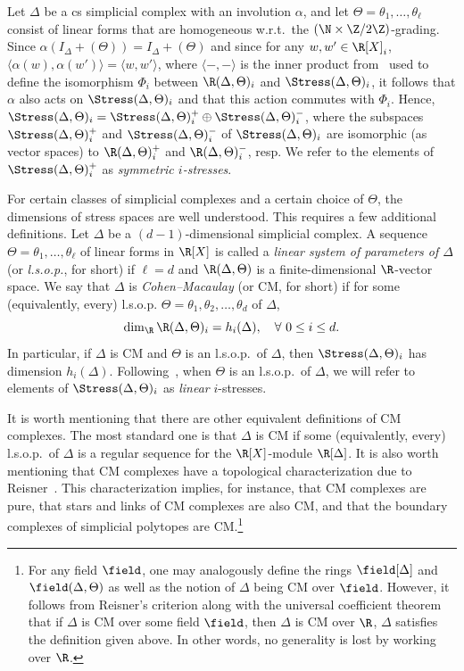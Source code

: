 Let $\Delta$ be a cs simplicial complex with an involution $\alpha$, and let $\Theta=\theta_1,\ldots,\theta_\ell$ consist of linear forms that are homogeneous w.r.t.~the $(\N\times \Z/2\Z)$-grading. Since $\alpha(I_\Delta+(\Theta))=I_\Delta+(\Theta)$ and since for any $w,w'\in \R[X]_i$, $\langle\alpha(w),\alpha(w')\rangle=\langle w,w'\rangle$, where $\langle-,-\rangle$ is the inner product from~\cite[Section 3]{Lee96} used to define the isomorphism $\Phi_i$ between $\R(\Delta, \Theta)_i$ and $\Stress(\Delta, \Theta)_i$, it follows that $\alpha$ also acts on $\Stress(\Delta, \Theta)_i$ and that this action commutes with $\Phi_i$. Hence, $\Stress(\Delta, \Theta)_i=\Stress(\Delta, \Theta)_i^+ \oplus \Stress(\Delta, \Theta)_i^-$, where the subspaces $\Stress(\Delta, \Theta)^+_i$ and $\Stress(\Delta, \Theta)^-_i$ of $\Stress(\Delta,\Theta)_i$ are isomorphic (as vector spaces) to $\R(\Delta, \Theta)^+_i$ and $\R(\Delta, \Theta)^-_i$, resp. We refer to the elements of $\Stress(\Delta, \Theta)^+_i$ as \emph{symmetric $i$-stresses}. 

For certain classes of simplicial complexes and a certain choice of $\Theta$, the dimensions of stress spaces are well understood. This requires a few additional definitions. 
Let $\Delta$ be a $(d-1)$-dimensional simplicial complex. A sequence $\Theta=\theta_1,\ldots,\theta_\ell$ of linear forms in $\R[X]$ is called a \emph{linear system of parameters of $\Delta$} (or \emph{l.s.o.p.}, for short) if $\ell=d$ and $\R(\Delta,\Theta)$ is a finite-dimensional $\R$-vector space. We say that $\Delta$ is \emph{Cohen--Macaulay} (or CM, for short) if for some (equivalently, every) l.s.o.p. $\Theta=\theta_1, \theta_2, \dots, \theta_d$ of $\Delta$, $$\dim_\R \R(\Delta,\Theta)_i=h_i(\Delta), \quad \forall \ 0\leq i\leq d.$$ In particular, if $\Delta$ is CM and $\Theta$ is an l.s.o.p.~of $\Delta$, then $\Stress(\Delta, \Theta)_i$ has dimension $h_i(\Delta)$. Following~\cite{Lee96}, when $\Theta$ is an l.s.o.p.~of $\Delta$, we will refer to elements of $\Stress(\Delta, \Theta)_i$ as \emph{linear} $i$-stresses.

It is worth mentioning that there are other equivalent definitions of CM complexes. The most standard one is that $\Delta$ is CM if some (equivalently, every) l.s.o.p.~of $\Delta$ is a regular sequence for the $\R[X]$-module $\R[\Delta]$. It is also worth mentioning that CM complexes have a topological characterization due to Reisner~\cite{Reisner}. This characterization implies, for instance, that CM complexes are pure, that stars and links of CM complexes are also CM, and that the boundary complexes of simplicial polytopes are CM.\footnote{For any field $\field$, one may analogously define the rings $\field[\Delta]$ and $\field(\Delta,\Theta)$ as well as the notion of $\Delta$ being CM over $\field$. However, it follows from Reisner's criterion along with the universal coefficient theorem that if $\Delta$ is CM over some field $\field$, then $\Delta$ is CM over $\R$, \ie $\Delta$ satisfies the definition given above. In other words, no generality is lost by working over $\R$.}

